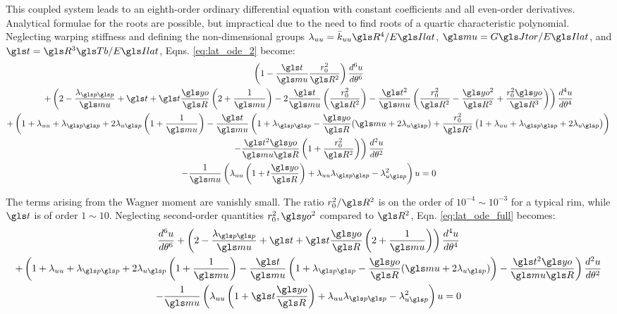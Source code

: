 \documentclass[\rootdir/thesis.tex]{subfiles}
\begin{document}
This coupled system leads to an eighth-order ordinary differential equation with constant coefficients and all even-order derivatives. Analytical formulae for the roots are possible, but impractical due to the need to find roots of a quartic characteristic polynomial. Neglecting warping stiffness and defining the non-dimensional groups $\lr_{uu}=\kuu \R^4/\EIl$, $\m=\GJ/\EIl$, and $\ts=\R^3\Tb/\EIl$, Eqns. \eqref{eq:lat_ode_2} become:
\begin{multline}
\label{eq:lat_ode_full}
  \left(1 - \frac{\ts}{\m}\frac{\ro^2}{\R^2}\right)\dt{u}{6}\\
  +\left(2 - \frac{\lr_{\p\p}}{\m} + \ts + \ts\frac{\yo}{\R}\left(2 + \frac{1}{\m}\right)
         -2\frac{\ts}{\m}\left(\frac{\ro^2}{\R^2}\right)
         -\frac{\ts^2}{\m}\left(\frac{\ro^2}{\R^2} - \frac{\yo^2}{\R^2} +
                               \frac{\ro^2\yo}{\R^3}\right) \right) \dt{u}{4}\\
  +\left(1 + \lr_{uu} + \lr_{\p\p} + 2\lr_{u\p}\left(1+\frac{1}{\m}\right)
         -\frac{\ts}{\m}\left(1 + \lr_{\p\p}
                             -\frac{\yo}{\R}(\m + 2\lr_{u\p})
                             +\frac{\ro^2}{\R^2}\left(1 + \lr_{uu} + \lr_{\p\p} + 2\lr_{u\p}\right)\right)\right.\\
         \left.-\frac{\ts^2\yo}{\m \R}\left(1 + \frac{\ro^2}{\R^2}\right)\right)\dt{u}{2}\\
  -\frac{1}{\m}\left(\lr_{uu}\left(1+t\frac{\yo}{\R}\right)
                      +\lr_{uu}\lr_{\p\p} - \lr_{u\p}^2\right)u = 0
\end{multline}

The terms arising from the Wagner moment are vanishly small. The ratio $\ro^2/\R^2$ is on the order of $10^{-4}\sim10^{-3}$ for a typical rim, while $\ts$ is of order $1\sim10$. Neglecting second-order quantities $\ro^2,\yo^2$ compared to $\R^2$, Eqn. \eqref{eq:lat_ode_full} becomes:
\begin{multline}
\label{eq:lat_ode}
  \dt{u}{6}
  +\left(2 - \frac{\lr_{\p\p}}{\m} + \ts + \ts\frac{\yo}{\R}\left(2 + \frac{1}{\m}\right)
         \right) \dt{u}{4}\\
  +\left(1 + \lr_{uu} + \lr_{\p\p} + 2\lr_{u\p}\left(1+\frac{1}{\m}\right)
         -\frac{\ts}{\m}\left(1 + \lr_{\p\p}
                             -\frac{\yo}{\R}(\m + 2\lr_{u\p})
                             \right)
         -\frac{\ts^2\yo}{\m \R}\right)\dt{u}{2}\\
  -\frac{1}{\m}\left(\lr_{uu}\left(1+\ts\frac{\yo}{\R}\right)
                      +\lr_{uu}\lr_{\p\p} - \lr_{u\p}^2\right)u = 0
\end{multline}
\end{document}
